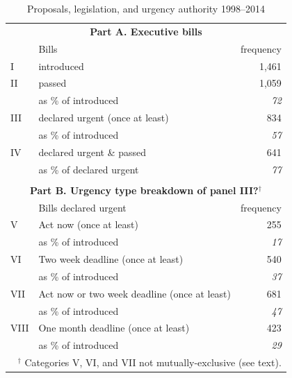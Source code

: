\documentclass[letter,12pt]{article}
\begin{document}
\begin{table}
\centering
\caption{Proposals, legislation, and urgency authority 1998--2014}\label{T:billDescriptives}
\begin{tabular}{llr}
\multicolumn{3}{c}{\textbf{Part A. Executive bills}} \\
   & Bills                           &   frequency  \\ \hline
I  & introduced                      &       1,461  \\ \hdashline
II & passed                          &       1,059  \\
   & as \% of introduced             &   \emph{72}  \\ \hdashline
III& declared urgent (once at least) &         834  \\
   & as \% of introduced             &   \emph{57}  \\ \hdashline
IV & declared urgent \& passed       &         641  \\
   & as \% of declared urgent        &   \emph{77}  \\ \hline
\\
\multicolumn{3}{c}{\textbf{Part B. Urgency type breakdown of panel III?$^\dagger$}} \\
    & Bills declared urgent                        &  frequency   \\ \hline
V   & Act now (once at least)                      &         255  \\
    & as \% of introduced                          &   \emph{17}  \\ \hdashline
VI  & Two week deadline (once at least)            &         540  \\
    & as \% of introduced                          &   \emph{37}  \\ \hdashline
VII & Act now or two week deadline (once at least) &         681  \\
    & as \% of introduced                          &   \emph{47}  \\ \hdashline
VIII& One month deadline (once at least)           &         423  \\
    & as \% of introduced                          &   \emph{29}  \\ %
\hline
\multicolumn{3}{r}{\footnotesize{$^\dagger$ Categories V, VI, and VII not mutually-exclusive (see text).}} \\
\end{tabular}
\end{table}
\end{document}
